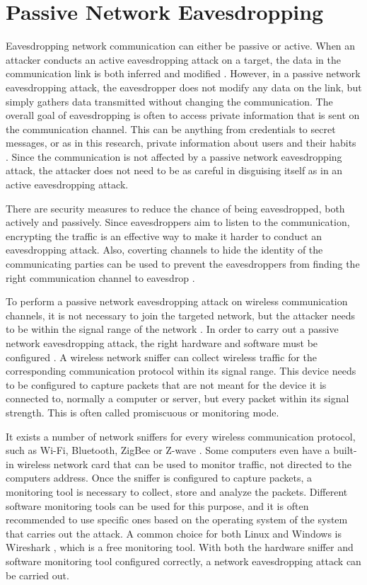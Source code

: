 \section{Passive Network Eavesdropping}
Eavesdropping network communication can either be passive or active. When an attacker conducts an active eavesdropping attack on a target, the data in the communication link is both inferred and modified \cite{Eavesdropping}. However, in a passive network eavesdropping attack, the eavesdropper does not modify any data on the link, but simply gathers data transmitted without changing the communication. The overall goal of eavesdropping is often to access private information that is sent on the communication channel. This can be anything from credentials to secret messages, or as in this research, private information about users and their habits \cite{Eavesdropping}. Since the communication is not affected by a passive network eavesdropping attack, the attacker does not need to be as careful in disguising itself as in an active eavesdropping attack.  

There are security measures to reduce the chance of being eavesdropped, both actively and passively. Since eavesdroppers aim to listen to the communication, encrypting the traffic is an effective way to make it harder to conduct an eavesdropping attack. Also, coverting channels to hide the identity of the communicating parties can be used to prevent the eavesdroppers from finding the right communication channel to eavesdrop \cite{Eavesdropping}.

To perform a passive network eavesdropping attack on wireless communication channels, it is not necessary to join the targeted network, but the attacker needs to be within the signal range of the network \cite{WifiEavesdropEnc}. In order to carry out a passive network eavesdropping attack, the right hardware and software must be configured \cite{Sniffingtech}. A wireless network sniffer can collect wireless traffic for the corresponding communication protocol within its signal range. This device needs to be configured to capture packets that are not meant for the device it is connected to, normally a computer or server, but every packet within its signal strength. This is often called promiscuous or monitoring mode. 

It exists a number of network sniffers for every wireless communication protocol, such as \gls{Wi-Fi}, Bluetooth, ZigBee or Z-wave \cite{Sniffingtech}. Some computers even have a built-in wireless network card that can be used to monitor traffic, not directed to the computers address. Once the sniffer is configured to capture packets, a monitoring tool is necessary to collect, store and analyze the packets. Different software monitoring tools can be used for this purpose, and it is often recommended to use specific ones based on the operating system of the system that carries out the attack. A common choice for both Linux and Windows is Wireshark \cite{Wireshark}, which is a free monitoring tool. With both the hardware sniffer and software monitoring tool configured correctly, a network eavesdropping attack can be carried out. 


